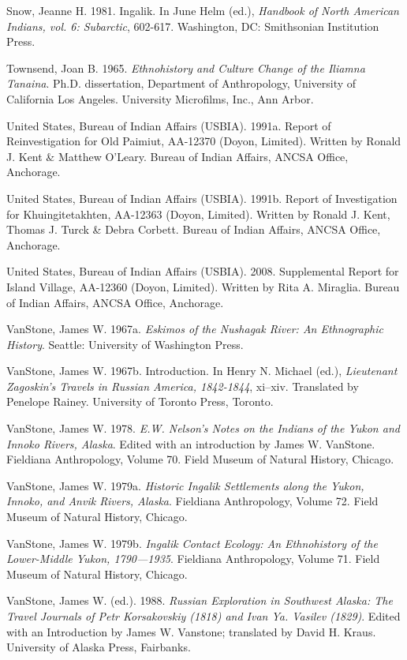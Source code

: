 \begin{hang}
Snow, Jeanne H. 1981. Ingalik. In June Helm (ed.), \textit{Handbook of North American Indians, vol. 6: Subarctic}, 602-617. Washington, DC: Smithsonian Institution Press.

Townsend, Joan B. 1965. \textit{Ethnohistory and Culture Change of the Iliamna Tanaina}. Ph.D. dissertation, Department of Anthropology, University of California Los Angeles. University Microfilms, Inc., Ann Arbor.

United States, Bureau of Indian Affairs (USBIA). 1991a.	Report of Reinvestigation for Old Paimiut, AA-12370 (Doyon, Limited). Written by Ronald J. Kent \& Matthew O’Leary. Bureau of Indian Affairs, ANCSA Office, Anchorage.

United States, Bureau of Indian Affairs (USBIA). 1991b.	Report of Investigation for Khuingitetakhten, AA-12363 (Doyon, Limited). Written by Ronald J. Kent, Thomas J. Turck \& Debra Corbett. Bureau of Indian Affairs, ANCSA Office, Anchorage.


United States, Bureau of Indian Affairs (USBIA). 2008. Supplemental Report for Island Village, AA-12360 (Doyon, Limited). Written by Rita A. Miraglia. Bureau of Indian Affairs, ANCSA Office, Anchorage.

VanStone, James W. 1967a.	\textit{Eskimos of the Nushagak River: An Ethnographic History}. Seattle: University of Washington Press.

VanStone, James W. 1967b.	Introduction.  In Henry N. Michael (ed.), \textit{Lieutenant Zagoskin’s Travels in Russian America, 1842-1844}, xi--xiv. Translated by Penelope Rainey.  University of Toronto Press, Toronto.

VanStone, James W. 1978. \textit{E.W. Nelson’s Notes on the Indians of the Yukon and Innoko Rivers, Alaska}. Edited with an introduction by James W. VanStone. Fieldiana Anthropology, Volume 70. Field Museum of Natural History, Chicago.

VanStone, James W. 1979a.	\textit{Historic Ingalik Settlements along the Yukon, Innoko, and Anvik Rivers, Alaska}. Fieldiana Anthropology, Volume 72. Field Museum of Natural History, Chicago.

VanStone, James W. 1979b.	\textit{Ingalik Contact Ecology: An Ethnohistory of the Lower-Middle Yukon, 1790—1935}. Fieldiana Anthropology, Volume 71. Field Museum of Natural History, Chicago.

VanStone, James W. (ed.). 1988. \textit{Russian Exploration in Southwest Alaska: The Travel Journals of Petr Korsakovskiy (1818) and Ivan Ya. Vasilev (1829)}. Edited with an Introduction by James W. Vanstone; translated by David H. Kraus. University of Alaska Press, Fairbanks.


\end{hang}
